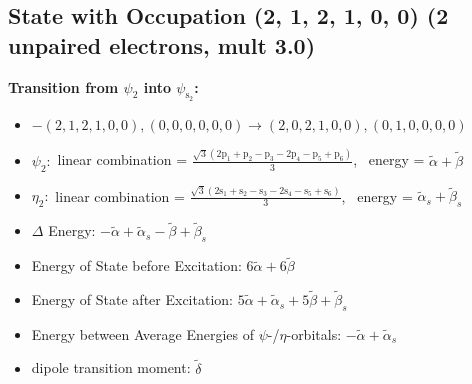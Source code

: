 \documentclass[12pt,a4paper]{article}
\begin{document}
\subsection*{State with Occupation (2, 1, 2, 1, 0, 0) (2 unpaired electrons, mult 3.0)}
        \noindent\textbf{Transition from $\psi_{2}$ into $\psi_{\text{s}_{2}}$:}
        \begin{itemize}
            \item $- (2, 1, 2, 1, 0, 0), (0, 0, 0, 0, 0, 0) \rightarrow (2, 0, 2, 1, 0, 0), (0, 1, 0, 0, 0, 0)$
        
            \item $\psi_{2}:$ linear combination = $\frac{\sqrt{3} \left(2 \text{p}_{1} + \text{p}_{2} - \text{p}_{3} - 2 \text{p}_{4} - \text{p}_{5} + \text{p}_{6}\right)}{3}$, \
            energy = $\tilde{\alpha} + \tilde{\beta}$
            
            \item $\eta_{2}:$ linear combination = $\frac{\sqrt{3} \left(2 \text{s}_{1} + \text{s}_{2} - \text{s}_{3} - 2 \text{s}_{4} - \text{s}_{5} + \text{s}_{6}\right)}{3}$, \
            energy = $\tilde{\alpha}_{s} + \tilde{\beta}_{s}$
            
                \item $\Delta$ Energy: $- \tilde{\alpha} + \tilde{\alpha}_{s} - \tilde{\beta} + \tilde{\beta}_{s}$
                \item Energy of State before Excitation: $6 \tilde{\alpha} + 6 \tilde{\beta}$
                \item Energy of State after Excitation: $5 \tilde{\alpha} + \tilde{\alpha}_{s} + 5 \tilde{\beta} + \tilde{\beta}_{s}$
                \item Energy between Average Energies of $\psi$-/$\eta$-orbitals: $- \tilde{\alpha} + \tilde{\alpha}_{s}$
            
            \item dipole transition moment: $\tilde{\delta}$
        
        \end{itemize}
        
\end{document}
